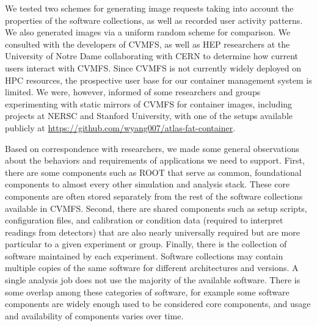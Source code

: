 \documentclass[sigconf]{acmart}
\begin{document}
We tested two schemes for generating image requests taking into account the properties of the software collections,
as well as recorded user activity patterns.
We also generated images via a uniform random scheme for comparison.
We consulted with the developers of CVMFS,
as well as HEP researchers at the University of Notre Dame collaborating with CERN to determine how current users interact with CVMFS.
Since CVMFS is not currently widely deployed on HPC resources,
the prospective user base for our container management system is limited.
We were, however, informed of some researchers and groups experimenting with static mirrors of CVMFS for container images,
including projects at NERSC and Stanford University,
with one of the setups available publicly at \url{https://github.com/wyang007/atlas-fat-container}.

Based on correspondence with researchers,
we made some general observations about the behaviors and requirements of applications we need to support.
First, there are some components such as ROOT that serve as common, foundational components to almost every other simulation and analysis stack.
These core components are often stored separately from the rest of the software collections available in CVMFS.
Second, there are shared components such as setup scripts, configuration files, and calibration or condition data (required to interpret readings from detectors) that are also nearly universally required but are more particular to a given experiment or group.
Finally, there is the collection of software maintained by each experiment.
Software collections may contain multiple copies of the same software for different architectures and versions.
A single analysis job does not use the majority of the available software.
There is some overlap among these categories of software,
for example some software components are widely enough used to be considered core components,
and usage and availability of components varies over time.
\end{document}
